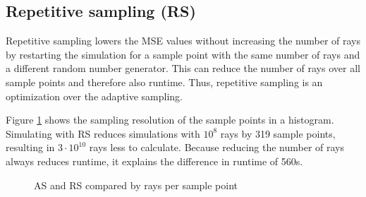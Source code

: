 \subsection{Repetitive sampling (RS)}
Repetitive sampling lowers the MSE values without increasing the number of rays by restarting the
simulation for a sample point with the same number of rays and a different random number 
generator. This can reduce the number of rays over all sample points and therefore
also runtime. Thus, repetitive sampling is an optimization over the adaptive sampling. 

Figure \ref{plot:repetitive} shows the sampling resolution
of the sample points in a histogram. Simulating with RS reduces
simulations with $10^8$ rays by 319 sample points, resulting in 
$3\cdot10^{10}$ rays less to calculate. Because reducing the number of rays always
reduces runtime, it explains the difference in runtime
of 560s.
\begin{figure}[H]
  \centerline{
    }
  \caption{AS and RS compared by rays per sample point}
  \label{plot:repetitive}
\end{figure}

